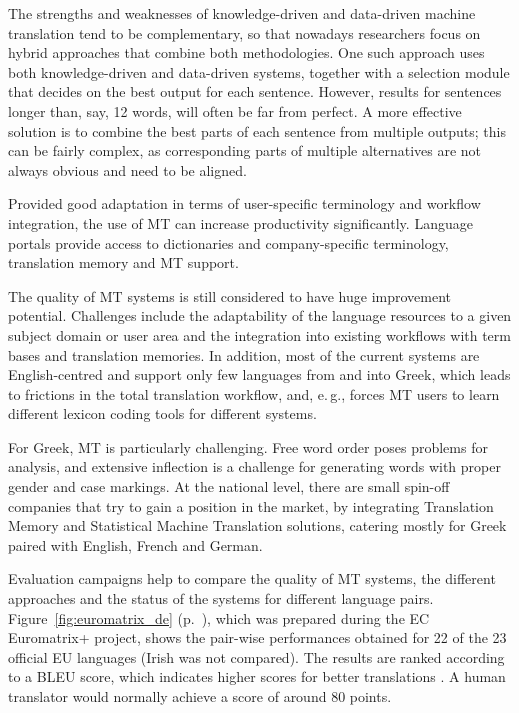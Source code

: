 \documentclass[]{../../metanetpaper}
\begin{document}
\begin{multicols}{2}
The strengths and weaknesses of knowledge-driven and data-driven machine translation tend to be complementary, so that nowadays researchers focus on hybrid approaches that combine both methodologies. One such approach uses both knowledge-driven and data-driven systems, together with a selection module that decides on the best output for each sentence. However, results for sentences longer than, say, 12 words, will often be far from perfect. A more effective solution is to combine the best parts of each sentence from multiple outputs; this can be fairly complex, as corresponding parts of multiple alternatives are not always obvious and need to be aligned. 

Provided good adaptation in terms of user-specific terminology and workflow integration, the use of MT can increase productivity significantly. Language portals provide access to dictionaries and company-specific terminology, translation memory and MT support.


The quality of MT systems is still considered to have huge improvement potential. Challenges include the adaptability of the language resources to a given subject domain or user area and the integration into existing workflows with term bases and translation memories. In addition, most of the current systems are English-centred and support only few languages from and into Greek, which leads to frictions in the total translation workflow, and, e.\,g., forces MT users to learn different lexicon coding tools for different systems.

For Greek, MT is particularly challenging. Free word order poses problems for analysis, and extensive inflection is a challenge for generating words with proper gender and case markings. At the national level, there are small spin-off companies that try to gain a position in the market, by integrating Translation Memory and Statistical Machine Translation solutions, catering mostly for Greek paired with English, French and German.

Evaluation campaigns help to compare the quality of MT systems, the different approaches and the status of the systems for different language pairs. Figure~\ref{fig:euromatrix_de} (p.~\pageref{fig:euromatrix_de}), which was prepared during the EC Euromatrix+ project, shows the pair-wise performances obtained for 22 of the 23 official EU languages (Irish was not compared). The results are ranked according to a BLEU score, which indicates higher scores for better translations \cite{bleu1}. A human translator would normally achieve a score of around 80 points.


\end{multicols}
\end{document}
